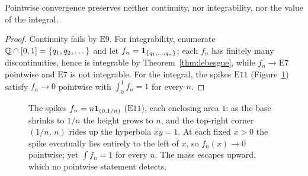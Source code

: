 \begin{theorem}\label{thm:ptwise}
Pointwise convergence preserves neither continuity, nor integrability, nor
the value of the integral.
\end{theorem}

\begin{proof}
Continuity fails by $\mathrm{E}9$. For integrability, enumerate
$\mathbb{Q}\cap[0,1]=\{q_1,q_2,\dots\}$ and let $f_n = \mathbf{1}_{\{q_1,\dots,q_n\}}$; each
$f_n$ has finitely many discontinuities, hence is integrable by
Theorem~\ref{thm:lebesgue}, while $f_n \to \mathrm{E}7$ pointwise and
$\mathrm{E}7$ is not integrable. For the integral, the spikes
$\mathrm{E}11$ (Figure~\ref{fig:spikes}) satisfy $f_n \to 0$ pointwise with $\int_0^1 f_n = 1$ for
every $n$.
\end{proof}

\begin{figure}[htbp]
\centering
{}
\caption{The spikes $f_n = n\mathbf{1}_{(0,1/n)}$ ($\mathrm{E}11$), each enclosing
area $1$: as the base shrinks to $1/n$ the height grows to $n$, and the
top-right corner $(1/n,\,n)$ rides up the hyperbola $xy=1$. At each fixed
$x>0$ the spike eventually lies entirely to the left of $x$, so
$f_n(x)\to0$ pointwise; yet $\int f_n = 1$ for every $n$. The mass escapes
upward, which no pointwise statement detects.}
\label{fig:spikes}
\end{figure}

